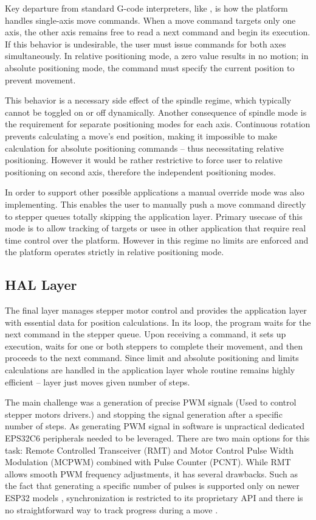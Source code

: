 Key departure from standard G-code interpreters, like \cite{duet}, is how the platform handles single-axis move commands.
When a move command targets only one axis, the other axis remains free to read a next command and begin its execution.
If this behavior is undesirable, the user must issue commands for both axes simultaneously.
In relative positioning mode, a zero value results in no motion; in absolute positioning mode, the command must specify the current position to prevent movement.

This behavior is a necessary side effect of the spindle regime, which typically cannot be toggled on or off dynamically.
Another consequence of spindle mode is the requirement for separate positioning modes for each axis.
Continuous rotation prevents calculating a move’s end position, making it impossible to make calculation for absolute positioning commands -- thus necessitating relative positioning.
However it would be rather restrictive to force user to relative positioning on second axis, therefore the independent positioning modes.

In order to support other possible applications a manual override mode was also implementing.
This enables the user to manually push a move command directly to stepper queues totally skipping the application layer.
Primary usecase of this mode is to allow tracking of targets or usee in other application that require real time control over the platform.
However in this regime no limits are enforced and the platform operates strictly in relative positioning mode.

\subsection{HAL Layer}

The final layer manages stepper motor control and provides the application layer with essential data for position calculations.
In its loop, the program waits for the next command in the stepper queue.
Upon receiving a command, it sets up execution, waits for one or both steppers to complete their movement, and then proceeds to the next command.
Since limit and absolute positioning and limits calculations are handled in the application layer whole routine remains highly efficient -- layer just moves given number of steps.

The main challenge was a generation of precise PWM signals (Used to control stepper motors drivers.) and stopping the signal generation after a specific number of steps.
As generating PWM signal in software is unpractical dedicated EPS32C6 peripherals needed to be leveraged.
There are two main options for this task: Remote Controlled Transceiver (RMT) and Motor Control Pulse Width Modulation (MCPWM) combined with Pulse Counter (PCNT).
While RMT allows smooth PWM frequency adjustments, it has several drawbacks.
Such as the fact that generating a specific number of pulses is supported only on newer ESP32 models \cite{gitRMT}, synchronization is restricted to its proprietary API and there is no straightforward way to track progress during a move \cite{espRMT}.

